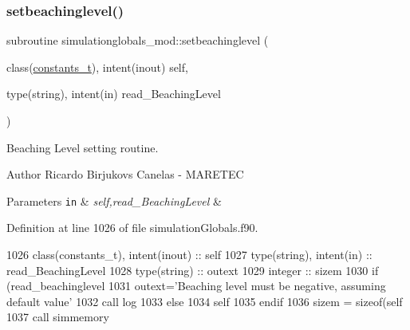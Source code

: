 \subsubsection{\texorpdfstring{setbeachinglevel()}{setbeachinglevel()}}
{\footnotesize\ttfamily subroutine simulationglobals\+\_\+mod\+::setbeachinglevel (\begin{DoxyParamCaption}\item[{class(\mbox{\hyperlink{structsimulationglobals__mod_1_1constants__t}{constants\+\_\+t}}), intent(inout)}]{self,  }\item[{type(string), intent(in)}]{read\+\_\+\+Beaching\+Level }\end{DoxyParamCaption})\hspace{0.3cm}{\ttfamily [private]}}



Beaching Level setting routine. 

\begin{DoxyAuthor}{Author}
Ricardo Birjukovs Canelas -\/ M\+A\+R\+E\+T\+EC 
\end{DoxyAuthor}

\begin{DoxyParams}[1]{Parameters}
\mbox{\tt in}  & {\em self,read\+\_\+\+Beaching\+Level} & \\
\hline
\end{DoxyParams}


Definition at line 1026 of file simulation\+Globals.\+f90.


\begin{DoxyCode}
1026     \textcolor{keywordtype}{class}(constants\_t), \textcolor{keywordtype}{intent(inout)} :: self
1027     \textcolor{keywordtype}{type}(string), \textcolor{keywordtype}{intent(in)} :: read\_BeachingLevel
1028     \textcolor{keywordtype}{type}(string) :: outext
1029     \textcolor{keywordtype}{integer} :: sizem
1030     \textcolor{keywordflow}{if} (read\_beachinglevel%
1031         outext=\textcolor{stringliteral}{'Beaching level must be negative, assuming default value'}
1032         \textcolor{keyword}{call }log%
1033     \textcolor{keywordflow}{else}
1034         self%
1035 \textcolor{keywordflow}{    endif}
1036     sizem = sizeof(self%
1037     \textcolor{keyword}{call }simmemory%
\end{DoxyCode}
\mbox{\label{namespacesimulationglobals__mod_aacd46eb198a99699d7be61b807363fc6}} 
